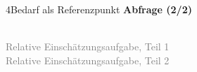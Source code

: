 \documentclass[xcolor=table,9pt,aspectratio=169]{beamer}
\begin{document}
\begin{frame}{\vspace*{10mm}4\hspace*{1em}Bedarf als Referenzpunkt}
\textbf{Abfrage (2/2)}\\
\begin{multicols}{2}
   \begin{center}
      \\
      \footnotesize{\textcolor{gray}{Relative Einschätzungsaufgabe, Teil 1}}
      \\
      \footnotesize{\textcolor{gray}{Relative Einschätzungsaufgabe, Teil 2}}
   \end{center}
\end{multicols}
\end{frame}
\end{document}
